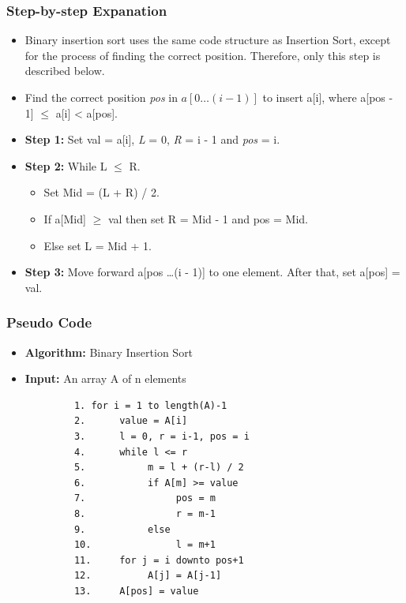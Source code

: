     \subsubsection{Step-by-step Expanation}
        \begin{itemize}
            \item Binary insertion sort uses the same code structure as Insertion Sort, except for the process of finding the correct position. Therefore, only this step is described below.
            \item Find the correct position \textit{pos} in $a[0\ldots (i - 1)]$ to insert a[i], where a[pos - 1] $\leq$ a[i] < a[pos].
            \item \textbf{Step 1:} Set val = a[i], \textit{L} = 0, \textit{R} = i - 1 and \textit{pos} = i.
            \item \textbf{Step 2:} While L $\leq$ R.
                \begin{itemize}
                    \item Set Mid = (L + R) / 2.
                    \item If a[Mid] $\geq$ val then set R = Mid - 1 and pos = Mid.
                    \item Else set L = Mid + 1.
                \end{itemize}
            \item \textbf{Step 3:} Move forward a[pos \ldots (i - 1)] to one element. After that, set a[pos] = val. 
        \end{itemize}

    \subsubsection{Pseudo Code}
        \begin{itemize}
            \item \textbf{Algorithm:} Binary Insertion Sort
            \item \textbf{Input:} An array A of n elements
        \end{itemize}
        \begin{verbatim}
            1. for i = 1 to length(A)-1
            2.      value = A[i]
            3.      l = 0, r = i-1, pos = i
            4.      while l <= r
            5.           m = l + (r-l) / 2
            6.           if A[m] >= value
            7.                pos = m
            8.                r = m-1
            9.           else
            10.               l = m+1
            11.     for j = i downto pos+1
            12.          A[j] = A[j-1]
            13.     A[pos] = value
        \end{verbatim}
